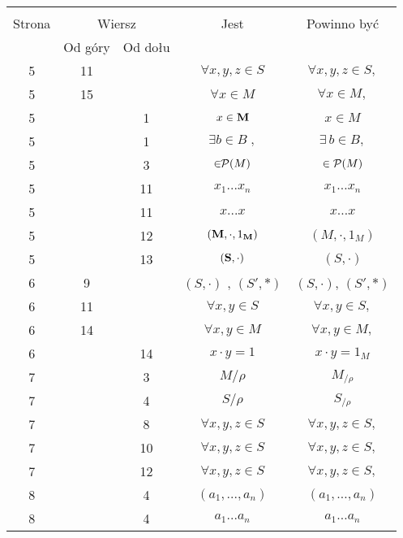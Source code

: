 \documentclass[a4paper,11pt]{article}
\begin{document}
\begin{center}

  \begin{tabular}{|c|c|c|c|c|}
    \hline
    & \multicolumn{2}{c|}{} & & \\
    Strona & \multicolumn{2}{c|}{Wiersz} & Jest
                              & Powinno być \\ \cline{2-3}
    & Od góry & Od dołu & & \\
    \hline
    5  & 11 & & $\forall x, y, z \in S$ & $\forall x, y, z \in S,$ \\
    5  & 15 & & $\forall x \in M$ & $\forall x \in M,$ \\
    5  & &  1 & $x \in \textrm{\textbf{M}}$ & $x \in M$ \\
    5  & &  1 & $\exists b \in B\; ,$ & $\exists \, b \in B,$ \\
    5  & &  3 & $\in \!\! \mathcal{P}( M )$ & $\in \mathcal{P}( M )$ \\
    5  & & 11 & $x_{ 1 } ... x_{ n }$ & $x_{ 1 } \ldots x_{ n }$ \\
    5  & & 11 & $x ... x$ & $x \ldots x$ \\
    5  & & 12 & $( \textrm{\textbf{M}}, \cdot, 1_{ \textrm{\textbf{M}}} )$
           & $( M, \cdot, 1_{ M } )$ \\
    5  & & 13 & $( \textrm{\textbf{S}}, \cdot )$ & $( S, \cdot )$ \\
    6  &  9 & & $( S, \cdot )${ }, { }{ }$( S', \ast )$
           & $( S, \cdot )$, $( S', \ast )$ \\
    6  & 11 & & $\forall x, y \in S$ & $\forall x, y \in S,$ \\
    6  & 14 & & $\forall x, y \in M$ & $\forall x, y \in M,$ \\
    6  & & 14 & $x \cdot y = 1$ & $x \cdot y = 1_{ M }$ \\
    7  & &  3 & $M / \rho$ & $M_{ / \rho }$ \\
    7  & &  4 & $S / \rho$ & $S_{ / \rho }$ \\
    7  & &  8 & $\forall x, y, z \in S$ & $\forall x, y, z \in S,$ \\
    7  & & 10 & $\forall x, y, z \in S$ & $\forall x, y, z \in S,$ \\
    7  & & 12 & $\forall x, y, z \in S$ & $\forall x, y, z \in S,$ \\
    8  & &  4 & $( a_{ 1 }, ..., a_{ n } )$ & $( a_{ 1 }, \ldots, a_{ n } )$ \\
    8  & &  4 & $a_{ 1 } ... a_{ n }$ & $a_{ 1 } \ldots a_{ n }$ \\

\end{tabular}
\end{center}
\end{document}

